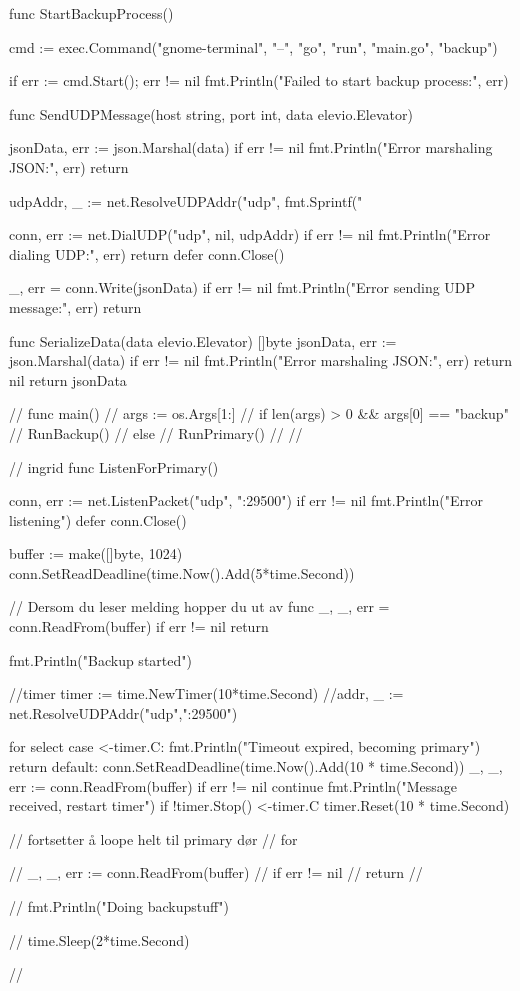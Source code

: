 func StartBackupProcess() {
    cmd := exec.Command("gnome-terminal", "--", "go", "run", "main.go", "backup")

    if err := cmd.Start(); err != nil {
        fmt.Println("Failed to start backup process:", err)
    }
}

func SendUDPMessage(host string, port int, data elevio.Elevator) {
    jsonData, err := json.Marshal(data)
    if err != nil {
        fmt.Println("Error marshaling JSON:", err)
        return
    }

    udpAddr, _ := net.ResolveUDPAddr("udp", fmt.Sprintf("%

    conn, err := net.DialUDP("udp", nil, udpAddr)
    if err != nil {
        fmt.Println("Error dialing UDP:", err)
        return
    }
    defer conn.Close()

    _, err = conn.Write(jsonData)
    if err != nil {
        fmt.Println("Error sending UDP message:", err)
        return
    }
}

func SerializeData(data elevio.Elevator) []byte {
    jsonData, err := json.Marshal(data)
    if err != nil {
        fmt.Println("Error marshaling JSON:", err)
        return nil
    }
    return jsonData
}

// func main() {
//     args := os.Args[1:]
//     if len(args) > 0 && args[0] == "backup" {
//         RunBackup()
//     } else {
//         RunPrimary()
//     }
// }

// ingrid
func ListenForPrimary() {
    conn, err := net.ListenPacket("udp", ":29500")
    if err != nil {
        fmt.Println("Error listening")
    }
    defer conn.Close()

    buffer := make([]byte, 1024)
    conn.SetReadDeadline(time.Now().Add(5*time.Second))

    // Dersom du leser melding hopper du ut av func
    _, _, err = conn.ReadFrom(buffer)
    if err != nil {
        return
    }

    fmt.Println("Backup started")

    //timer
    timer := time.NewTimer(10*time.Second)
    //addr, _ := net.ResolveUDPAddr("udp",":29500")

    for {
        select {
        case <-timer.C:
            fmt.Println("Timeout expired, becoming primary")
            return
        default:
            conn.SetReadDeadline(time.Now().Add(10 * time.Second))
            _, _, err := conn.ReadFrom(buffer)
            if err != nil {
                continue
            }
            fmt.Println("Message received, restart timer")
            if !timer.Stop() {
                <-timer.C
            }
            timer.Reset(10 * time.Second)
        }
    }

    // fortsetter å loope helt til primary dør
    // for {
    //     _, _, err := conn.ReadFrom(buffer)
    //     if err != nil {
    //         return
    //     }

    //     fmt.Println("Doing backupstuff")

    //     time.Sleep(2*time.Second)

    // }

}
